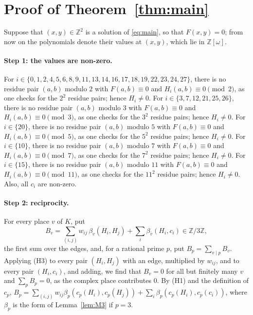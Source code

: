 \documentclass[11pt]{article}
\newcommand{\Z}{\mathbb{Z}}
\begin{document}
\section{Proof of Theorem~\ref{thm:main}}

Suppose that $(x,y)\in\Z^2$ is a solution of \eqref{eq:main}, so that $F(x,y)=0$; from now on the polynomials denote their values at $(x,y)$, which lie in $\Z[\omega]$.
\paragraph{Step 1: the values are non-zero.} For $i\in\{0,\allowbreak 1,\allowbreak 2,\allowbreak 4,\allowbreak 5,\allowbreak 6,\allowbreak 8,\allowbreak 9,\allowbreak 11,\allowbreak 13,\allowbreak 14,\allowbreak 16,\allowbreak 17,\allowbreak 18,\allowbreak 19,\allowbreak 22,\allowbreak 23,\allowbreak 24,\allowbreak 27\}$, there is no residue pair $(a,b)$ modulo $2$ with $F(a,b)\equiv0$ and $H_i(a,b)\equiv0\pmod{2}$, as one checks for the $2^2$ residue pairs; hence $H_i\neq0$. For $i\in\{3,\allowbreak 7,\allowbreak 12,\allowbreak 21,\allowbreak 25,\allowbreak 26\}$, there is no residue pair $(a,b)$ modulo $3$ with $F(a,b)\equiv0$ and $H_i(a,b)\equiv0\pmod{3}$, as one checks for the $3^2$ residue pairs; hence $H_i\neq0$. For $i\in\{20\}$, there is no residue pair $(a,b)$ modulo $5$ with $F(a,b)\equiv0$ and $H_i(a,b)\equiv0\pmod{5}$, as one checks for the $5^2$ residue pairs; hence $H_i\neq0$. For $i\in\{10\}$, there is no residue pair $(a,b)$ modulo $7$ with $F(a,b)\equiv0$ and $H_i(a,b)\equiv0\pmod{7}$, as one checks for the $7^2$ residue pairs; hence $H_i\neq0$. For $i\in\{15\}$, there is no residue pair $(a,b)$ modulo $11$ with $F(a,b)\equiv0$ and $H_i(a,b)\equiv0\pmod{11}$, as one checks for the $11^2$ residue pairs; hence $H_i\neq0$. Also, all $c_i$ are non-zero.

\paragraph{Step 2: reciprocity.} For every place $v$ of $K$, put
\begin{equation}\label{eq:B}
B_v=\sum_{(i,j)}w_{ij}\,\beta_v(H_i,H_j)+\sum_i\beta_v(H_i,c_i)\in\Z/3\Z,
\end{equation}
the first sum over the edges, and, for a rational prime $p$, put $B_p=\sum_{v\mid p}B_v$. Applying (H3) to every pair $(H_i,H_j)$ with an edge, multiplied by $w_{ij}$, and to every pair $(H_i,c_i)$, and adding, we find that $B_v=0$ for all but finitely many $v$ and $\sum_pB_p=0$, as the complex place contributes $0$. By (H1) and the definition of $c_p$, $B_p=\sum_{(i,j)}w_{ij}\beta_p(c_p(H_i),c_p(H_j))+\sum_i\beta_p(c_p(H_i),c_p(c_i))$, where $\beta_p$ is the form of Lemma~\ref{lem:M3} if $p=3$.
\end{document}
